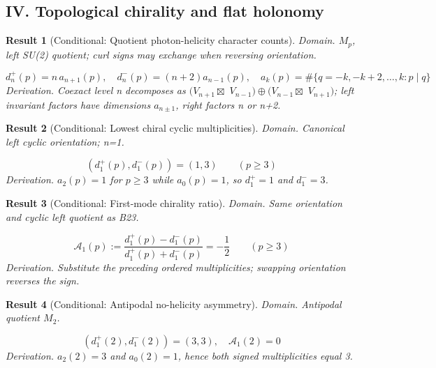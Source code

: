 \documentclass[aps,prd,onecolumn,notitlepage,groupedaddress,11pt]{revtex4-2}
\newtheorem{result}{Result}
\begin{document}
\subsection{IV. Topological chirality and flat holonomy}
\begin{result}[\textsf{Conditional}: Quotient photon-helicity character counts]\label{bridge:22}
\textit{Domain.} \(M_p\), left SU(2) quotient; curl signs may exchange when reversing orientation.\par
\begin{equation}\label{bridgeeq:22}
d_n^+(p)=n\,a_{n+1}(p),\quad d_n^-(p)=(n+2)a_{n-1}(p),\quad a_k(p)=\#\{q=-k,-k+2,\ldots,k:p\mid q\}
\end{equation}
\textit{Derivation.} Coexact level n decomposes as \((V_{n+1}\boxtimes\) \(V_{n-1})\oplus(V_{n-1}\boxtimes\) \(V_{n+1})\); left invariant factors have dimensions \(a_{n\pm1}\), right factors n or n+2.
\end{result}
\begin{result}[\textsf{Conditional}: Lowest chiral cyclic multiplicities]\label{bridge:23}
\textit{Domain.} Canonical left cyclic orientation; n=1.\par
\begin{equation}\label{bridgeeq:23}
(d_1^+(p),d_1^-(p))=(1,3)\qquad(p\ge3)
\end{equation}
\textit{Derivation.} \(a_2(p)=1\) for \(p\ge3\) while \(a_0(p)=1\), so \(d_1^+=1\) and \(d_1^-=3\).
\end{result}
\begin{result}[\textsf{Conditional}: First-mode chirality ratio]\label{bridge:24}
\textit{Domain.} Same orientation and cyclic left quotient as B23.\par
\begin{equation}\label{bridgeeq:24}
\mathcal A_1(p):=\frac{d_1^+(p)-d_1^-(p)}{d_1^+(p)+d_1^-(p)}=-\frac12\qquad(p\ge3)
\end{equation}
\textit{Derivation.} Substitute the preceding ordered multiplicities; swapping orientation reverses the sign.
\end{result}
\begin{result}[\textsf{Conditional}: Antipodal no-helicity asymmetry]\label{bridge:25}
\textit{Domain.} Antipodal quotient \(M_2\).\par
\begin{equation}\label{bridgeeq:25}
(d_1^+(2),d_1^-(2))=(3,3),\quad\mathcal A_1(2)=0
\end{equation}
\textit{Derivation.} \(a_2(2)=3\) and \(a_0(2)=1\), hence both signed multiplicities equal 3.
\end{result}
\end{document}
